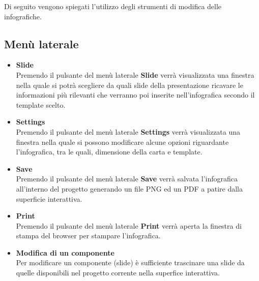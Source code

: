 \noindent
Di seguito vengono spiegati l'utilizzo degli strumenti di modifica delle infografiche.

\subsection{Menù laterale}
  \begin{itemize}
      \item \textbf{\gls{Slide}}\\
	  Premendo il pulsante del menù laterale \textbf{\gls{Slide}} verrà visualizzata una finestra nella quale si potrà scegliere da quali \gls{slide} della presentazione ricavare le informazioni più rilevanti che verranno poi inserite nell'\gls{infografica} secondo il \gls{template} scelto.
      \item \textbf{Settings}\\
	  Premendo il pulsante del menù laterale \textbf{Settings} verrà visualizzata una finestra nella quale si possono modificare alcune opzioni riguardante l'\gls{infografica}, tra le quali, dimensione della carta e \gls{template}.
      \item \textbf{Save}\\
	  Premendo il pulsante del menù laterale \textbf{Save} verrà salvata l'\gls{infografica} all'interno del progetto generando un file \gls{PNG} ed un PDF a patire dalla superficie interattiva.
      \item \textbf{Print}\\
	  Premendo il pulsante del menù laterale \textbf{Print} verrà aperta la finestra di stampa del \gls{browser} per stampare l'\gls{infografica}.
      \item \textbf{Modifica di un componente}\\
	  Per modificare un componente (\gls{slide}) è sufficiente trascinare una \gls{slide} da quelle disponibili nel progetto corrente nella superfice interattiva.
  \end{itemize}
